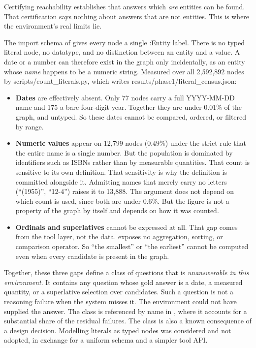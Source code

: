 Certifying reachability establishes that answers which \emph{are} entities can
be found. That certification says nothing about answers that are not entities.
This is where the environment's real limits lie.

The import schema of  gives every node a single
\textsf{:Entity} label. There is no typed literal node, no datatype, and no
distinction between an entity and a value. A date or a number can therefore
exist in the graph only incidentally, as an entity whose \emph{name} happens to
be a numeric string. Measured over all 2{,}592{,}892 nodes by
\textsf{scripts/count\_literals.py}, which writes
\textsf{results/phase1/literal\_census.json}:

\begin{itemize}
  \item \textbf{Dates} are effectively absent. Only 77 nodes carry a full
  \textsf{YYYY-MM-DD} name and 175 a bare four-digit year. Together they are
  under $0.01\%$ of the graph, and untyped. So these dates cannot be compared,
  ordered, or filtered by range.
  \item \textbf{Numeric values} appear on 12{,}799 nodes ($0.49\%$) under the
  strict rule that the entire name is a single number. But the population is
  dominated by identifiers such as ISBNs rather than by measurable quantities.
  That count is sensitive to its own definition. That sensitivity is why the
  definition is committed alongside it. Admitting names that merely carry no
  letters (\textsf{``(1955)''}, \textsf{``12-4''}) raises it to 13{,}888. The
  argument does not depend on which count is used, since both are under $0.6\%$.
  But the figure is not a property of the graph by itself and depends on how it
  was counted.
  \item \textbf{Ordinals and superlatives} cannot be expressed at all. That gap
  comes from the tool layer, not the data.  exposes no
  aggregation, sorting, or comparison operator. So ``the smallest'' or ``the
  earliest'' cannot be computed even when every candidate is present in the
  graph.
\end{itemize}

Together, these three gaps define a class of questions that is
\emph{unanswerable in this environment}. It contains any question whose gold
answer is a date, a measured quantity, or a superlative selection over
candidates. Such a question is not a reasoning failure when the system misses
it. The environment could not have supplied the answer. The class is referenced
by name in , where it accounts for a substantial share of the
residual failures. The class is also a known consequence of a design decision.
Modelling literals as typed nodes was considered and not adopted, in exchange
for a uniform schema and a simpler tool API.

\endinput
